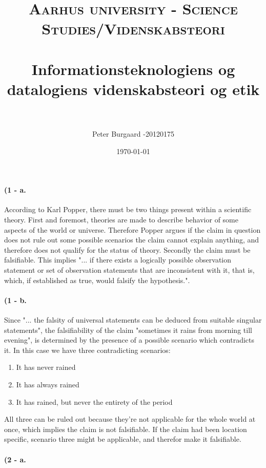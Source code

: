 \documentclass[paper=a4, fontsize=12pt]{scrartcl} %
\title{	
	\normalfont \normalsize 
	\textsc{Aarhus university - Science Studies/Videnskabsteori} \\ [25pt] %
	\horrule{0.5pt} \\[0.4cm] %
	\huge Informationsteknologiens og datalogiens videnskabsteori og etik \\ %
	\horrule{2pt} \\[0.5cm] %
}
\author{Peter Burgaard -20120175} %
\date{\normalsize\today} %
\numberwithin{equation}{section} %
\numberwithin{figure}{section} %
\numberwithin{table}{section} %
\begin{document}
	
	\maketitle %
	
	
	\paragraph{(1 - a.}
	
	According to Karl Popper, there must be two things present within a scientific theory. First and foremost, theories are made to describe behavior of some aspects of the world or universe\cite{POP61}. Therefore Popper argues  if the claim in question does not rule out some possible scenarios the claim cannot explain anything, and therefore does not qualify for the status of theory\cite{POP59}. Secondly the claim must be falsifiable. This implies  "... if there exists a logically possible observation statement or set of observation statements that are inconsistent with it, that is, which, if established as true, would falsify the hypothesis."\cite{POP62}. 
	
	\paragraph{(1 - b.}
	
	Since "... the falsity of universal statements can be deduced from suitable singular statements"\cite{POP61}, the falsifiability of the claim "sometimes it rains from morning till evening", is determined by the presence of a possible scenario which contradicts it. In this case we have three contradicting scenarios:
	\begin{enumerate}[nolistsep]
		\item It has never rained
		\item It has always rained
		\item It has rained, but never the entirety of the period 
	\end{enumerate}  
	All three can be ruled out because they're not applicable for the whole world at once, which implies the claim is not falsifiable. If the claim had been location specific, scenario three might be applicable, and therefor make it falsifiable.
	
	\paragraph{(2 - a.}
	
\end{document}
